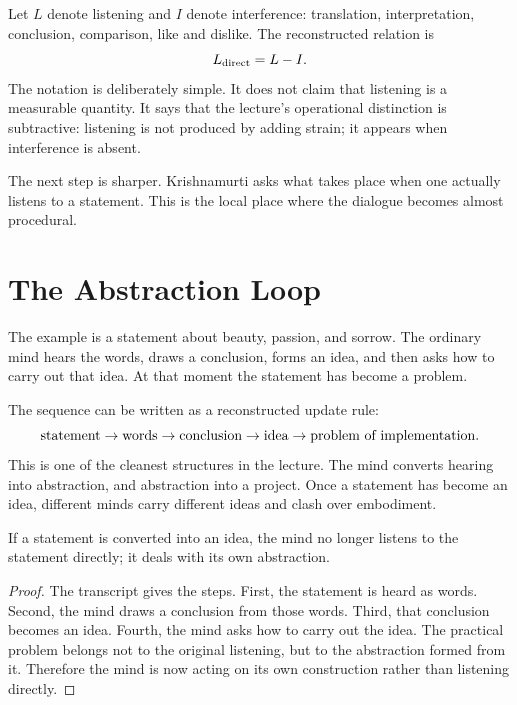 Let \(L\) denote listening and \(I\) denote interference: translation, interpretation, conclusion, comparison, like and dislike. The reconstructed relation is
\begin{equation}
L_{\rm direct}=L-I .
\end{equation}
The notation is deliberately simple. It does not claim that listening is a measurable quantity. It says that the lecture's operational distinction is subtractive: listening is not produced by adding strain; it appears when interference is absent.

The next step is sharper. Krishnamurti asks what takes place when one actually listens to a statement. This is the local place where the dialogue becomes almost procedural.

\section{The Abstraction Loop}

The example is a statement about beauty, passion, and sorrow. The ordinary mind hears the words, draws a conclusion, forms an idea, and then asks how to carry out that idea. At that moment the statement has become a problem.

The sequence can be written as a reconstructed update rule:
\begin{equation}
\hbox{statement}
\to
\hbox{words}
\to
\hbox{conclusion}
\to
\hbox{idea}
\to
\hbox{problem of implementation}.
\end{equation}
This is one of the cleanest structures in the lecture. The mind converts hearing into abstraction, and abstraction into a project. Once a statement has become an idea, different minds carry different ideas and clash over embodiment.

\begin{proposition}
If a statement is converted into an idea, the mind no longer listens to the statement directly; it deals with its own abstraction.
\end{proposition}

\begin{proof}
The transcript gives the steps. First, the statement is heard as words. Second, the mind draws a conclusion from those words. Third, that conclusion becomes an idea. Fourth, the mind asks how to carry out the idea. The practical problem belongs not to the original listening, but to the abstraction formed from it. Therefore the mind is now acting on its own construction rather than listening directly.
\end{proof}

